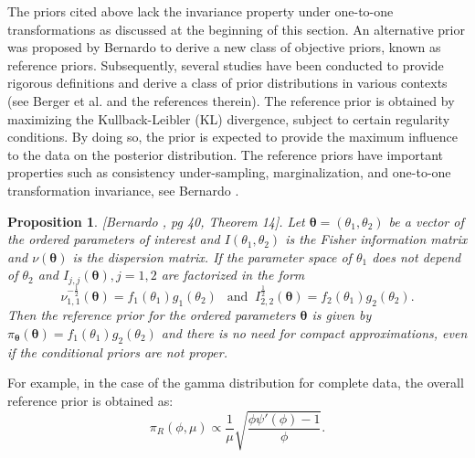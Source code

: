 \documentclass[]{interact}
\theoremstyle{plain}%
\newtheorem{proposition}[theorem]{Proposition}
\theoremstyle{definition}
\theoremstyle{remark}
\begin{document}
The priors cited above lack the invariance property under one-to-one transformations as discussed at the beginning of this section. An alternative prior was proposed by Bernardo \cite{bernardo1979a}  to derive a new class of objective priors, known as reference priors. Subsequently, several studies have been conducted to provide rigorous definitions and derive a class of prior distributions in various contexts (see Berger et al. \cite{berger2015} and the references therein). The reference prior is obtained by maximizing the Kullback-Leibler (KL) divergence, subject to certain regularity conditions. By doing so, the prior is expected to provide the maximum influence to the data on the posterior distribution. The reference priors have important properties such as consistency under-sampling, marginalization, and one-to-one transformation invariance, see Bernardo \cite{bernardo2005}. 

\begin{proposition}\label{propositionop} [Bernardo \cite{bernardo2005}, pg 40, Theorem 14]. Let $\boldsymbol\theta=(\theta_1,\theta_2)$ be a vector of the ordered parameters of interest and $I(\theta_1,\theta_2)$ is the Fisher information matrix and {\color{black}$\nu(\boldsymbol\theta)$ is the dispersion matrix}. If the parameter space  of $\theta_1$ does not depend of $\theta_2$ and $I_{j,j}(\boldsymbol\theta), j=1,2$ are factorized in the form 
\begin{equation*}
\nu_{1,1}^{-\frac{1}{2}}(\boldsymbol\theta)=f_1(\theta_1)g_1(\theta_2) \ \ \mbox{ and } \ I_{2,2}^{\frac{1}{2}}(\boldsymbol\theta)=f_2(\theta_1)g_2(\theta_2) . 
\end{equation*}
Then the reference prior for the ordered parameters $\boldsymbol\theta$ is given by $\pi_{\boldsymbol\theta}(\boldsymbol\theta)=f_1(\theta_1)g_2(\theta_2)$ and there is no need for compact approximations, even if the conditional priors are not proper.
\end{proposition} 

For example, in the case of the gamma distribution for complete data, the overall reference prior is obtained as:
\begin{equation*}%
\pi_R\left(\phi,\mu\right)\propto \frac{1}{\mu}\sqrt{\frac{\phi\psi'(\phi)-1}{\phi}}.
\end{equation*}
\end{document}
